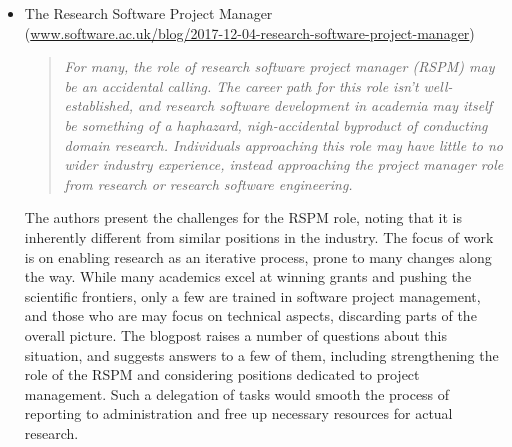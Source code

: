 \documentclass[11pt,letterpaper]{article}
\begin{document}
\begin{itemize}
\item The Research Software Project Manager\\(\href{https://www.software.ac.uk/blog/2017-12-04-research-software-project-manager}{www.software.ac.uk/blog/2017-12-04-research-software-project-manager})
\begin{quote}\textit{
For many, the role of research software project manager (RSPM) may be an accidental calling. The career path for this role isn’t well-established, and research software development in academia may itself be something of a haphazard, nigh-accidental byproduct of conducting domain research. Individuals approaching this role may have little to no wider industry experience, instead approaching the project manager role from research or research software engineering.}
\end{quote}
The authors present the challenges for the RSPM role, noting that it is inherently different from similar positions in the industry. The focus of work is on enabling research as an iterative process, prone to many changes along the way. While many academics excel at winning grants and pushing the scientific frontiers, only a few are trained in software project management, and those who are may focus on technical aspects, discarding parts of the overall picture. The blogpost raises a number of questions about this situation, and suggests answers to a few of them, including strengthening the role of the RSPM and considering positions dedicated to project management. Such a delegation of tasks would smooth the process of reporting to administration and free up necessary resources for actual research. 



\end{itemize}
\end{document}
